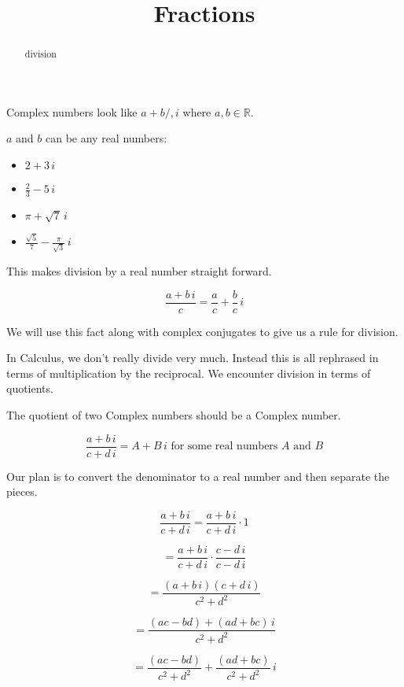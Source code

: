 \documentclass{ximera}
\title{Fractions}
\begin{document}
\begin{abstract}
division
\end{abstract}
\maketitle




Complex numbers look like $a + b /, i$ where $a, b \in \mathbb{R}$.


$a$ and $b$ can be any real numbers:



\begin{itemize}
	\item $2 + 3 \, i$
	\item $\frac{2}{3} - 5 \, i$
	\item $\pi + \sqrt{7} \, i$
	\item $\frac{\sqrt{5}}{7} - \frac{\pi}{\sqrt{3}} \, i$
\end{itemize}



This makes division by a real number straight forward.




\[
\frac{a + b \, i}{c} = \frac{a}{c} + \frac{b}{c} \, i
\]





We will use this fact along with complex conjugates to give us a rule for division.



In Calculus, we don't really divide very much.  Instead this is all rephrased in terms of multiplication by the reciprocal.  We encounter division in terms of quotients.


The quotient of two Complex numbers should be a Complex number.

\[
\frac{a + b \, i}{c + d \, i}  = A + B \, i  \text{ for some real numbers } A \text{ and } B
\]


Our plan is to convert the denominator to a real number and then separate the pieces.



\[
\frac{a + b \, i}{c + d \, i} = \frac{a + b \, i}{c + d \, i}  \cdot 1 
\]

\[
= \frac{a + b \, i}{c + d \, i} \cdot \frac{c - d \, i}{c - d \, i} 
\]

\[
= \frac{(a + b \, i)(c + d \, i)}{c^2 + d^2} 
\]

\[
= \frac{(ac - bd) + (ad + bc) \, i}{c^2 + d^2} 
\]

\[
= \frac{(ac - bd)}{c^2 + d^2}  + \frac{(ad + bc)}{c^2 + d^2} \, i
\]
\end{document}
